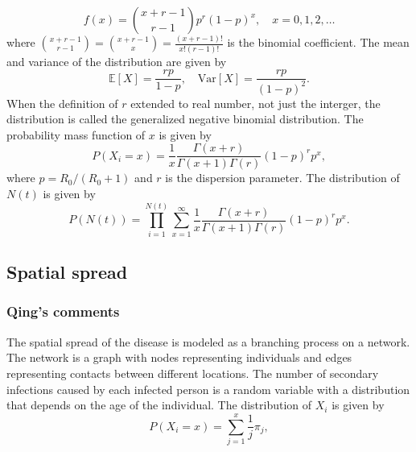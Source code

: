 \documentclass{article}
\begin{document}
\begin{equation}
    f(x) = \binom{x+r-1}{r-1} p^r (1-p)^x, \quad x = 0, 1, 2, \ldots
\end{equation}
where $\binom{x+r-1}{r-1} = \binom{x+r-1}{x}  = \frac{(x+r-1)!}{x! (r-1)!}$ is the binomial coefficient. The mean and variance of the distribution are given by
\begin{equation}
    \mathbb{E}[X] = \frac{rp}{1-p}, \quad \text{Var}[X] = \frac{rp}{(1-p)^2}.
\end{equation}
When the definition of $r$ extended to real number, not just the interger, the distribution is called the generalized negative binomial distribution. The probability mass function of $x$ is given by
\begin{equation}
P(X_i = x) = \frac{1}{x} \frac{\Gamma(x+r)}{\Gamma(x+1) \Gamma(r)} (1-p)^r p^x,
\end{equation}
where $p = R_{0} / (R_{0} + 1)$ and $r$ is the dispersion parameter. The distribution of $N(t)$ is given by
\begin{equation}
P(N(t)) = \prod_{i=1}^{N(t)} \sum_{x=1}^{\infty} \frac{1}{x} \frac{\Gamma(x+r)}{\Gamma(x+1) \Gamma(r)} (1-p)^r p^x.
\end{equation}


\subsection{Spatial spread}
\subsubsection*{Qing's comments}
The spatial spread of the disease is modeled as a branching process on a network. The network is a graph with nodes representing individuals and edges representing contacts between different locations. The number of secondary infections caused by each infected person is a random variable with a distribution that depends on the age of the individual. The distribution of $X_i$ is given by
\begin{equation}
P(X_i = x) = \sum_{j=1}^{x} \frac{1}{j} \pi_j,
\end{equation}

\printbibliography
\end{document}
